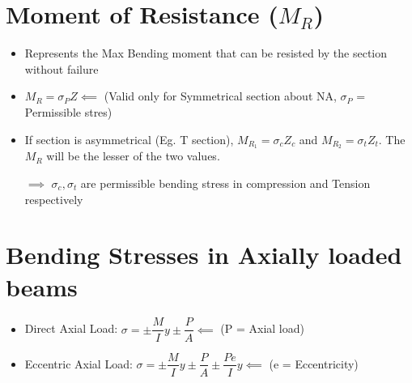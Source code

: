 \documentclass[8pt]{report}
\begin{document}
	\section{Moment of Resistance ($M_R$)}
		\begin{itemize}
			\item Represents the Max Bending moment that can be resisted by the section without failure
			\item $\boxed{M_R=\sigma_PZ} \impliedby$ (Valid only for Symmetrical section about NA, $\sigma_P$ = Permissible stres)
			\item If section is asymmetrical (Eg. T section), $\boxed{M_{R_1} = \sigma_cZ_c}$ and $\boxed{M_{R_2} = \sigma_tZ_t}$. The $M_R$ will be the lesser of the two values. 
			\item[$\implies$] $\sigma_c,\sigma_t$ are permissible bending stress in compression and Tension respectively 
		\end{itemize}\hrulefill
	\section{Bending Stresses in Axially loaded beams}
		\begin{itemize}
			\item Direct Axial Load: $\boxed{\sigma = \pm\dfrac{M}{I}y\pm\dfrac{P}{A}} \impliedby$ (P = Axial load)
			\item Eccentric Axial Load: $\boxed{\sigma = \pm\dfrac{M}{I}y\pm\dfrac{P}{A}\pm\dfrac{Pe}{I}y} \impliedby$ (e = Eccentricity)
		\end{itemize}\hrulefill
\end{document}

